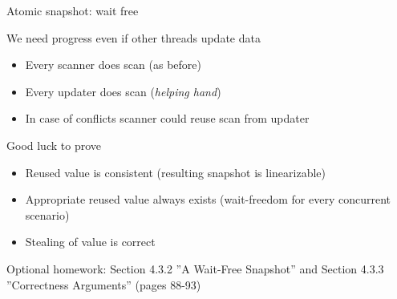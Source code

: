 %
%
%
%

\begin{frame}{Atomic snapshot: wait free}

We need progress even if other threads update data
\begin{itemize}
  \pause
  \item Every scanner does scan (as before)
  \pause
  \item Every updater does scan  (\textit{helping hand})
  \pause
  \item In case of conflicts scanner could reuse scan from updater
\end{itemize}
\pause
Good luck to prove
\begin{itemize}
  \item Reused value is consistent (resulting snapshot is linearizable)
  \item Appropriate reused value always exists (wait-freedom for every concurrent scenario)
  \item Stealing of value is correct
\end{itemize}

\pause
Optional homework: Section 4.3.2 ''A Wait-Free Snapshot'' and Section 4.3.3 ''Correctness Arguments'' (pages 88-93)

\end{frame}



